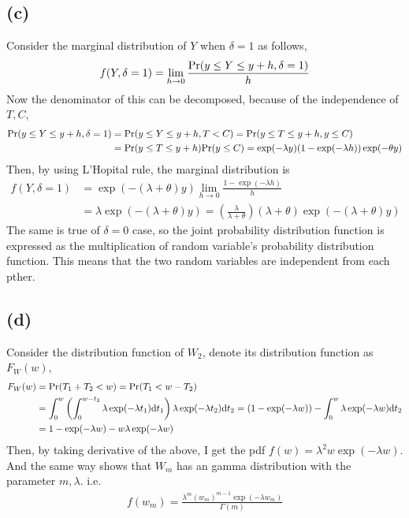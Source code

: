 \documentclass{article}
\begin{document}
\subsection{(c)}
Consider the marginal distribution of $Y$ when $\delta = 1$ as follows,
\begin{align*}
	f(Y, \delta = 1) = \lim_{h \to 0} \frac{{\rm Pr}(y \leq Y \leq y + h, \delta = 1)}{h}
\end{align*}
Now the denominator of this can be decomposed, because of the independence of $T, C$, 
\begin{align*}
	{\rm Pr}(y \leq Y \leq y + h, \delta = 1) &= {\rm Pr}(y \leq Y \leq y + h, T < C) = {\rm Pr}(y \leq T \leq y + h, y \leq C) \\
	&= {\rm Pr}(y \leq T \leq y + h) {\rm Pr}(y \leq C) = \exp(-\lambda y) (1 - \exp(-\lambda h)) \exp(-\theta y) \\
\end{align*}
Then, by using L'Hopital rule, the marginal distribution is 
\begin{align*}
	f(Y, \delta = 1) &= \exp(-(\lambda+\theta)y) \lim_{h \to 0} \frac{1 - \exp(-\lambda h)}{h}\\
	&= \lambda \exp(-(\lambda+\theta)y) = \left(\frac{\lambda}{\lambda+ \theta}\right) (\lambda+\theta)\exp(-(\lambda+\theta)y)
\end{align*}
The same is true of $\delta = 0$ case, so the joint probability distribution function is expressed as the multiplication of random variable's probability distribution function. This means that the two random variables are independent from each pther.

\subsection{(d)}
Consider the distribution function of $W_2$, denote its distribution function as $F_W(w)$,
\begin{align*}
	F_W(w) &= {\rm Pr}(T_1 + T_2 < w) = {\rm Pr}(T_1 < w - T_2)\\
	&= \int_0^w \left( \int_0^{w - t_2} \lambda \exp(-\lambda t_1) \mathrm{d}t_1 \right) \lambda \exp(-\lambda t_2) \mathrm{d}t_2
	=(1 - \exp(-\lambda w)) - \int_0^w \lambda \exp(-\lambda w) \mathrm{d}t_2 \\
	&= 1 - \exp(-\lambda w) - w \lambda \exp(-\lambda w)
\end{align*}
Then, by taking derivative of the above, I get the pdf $f(w) = \lambda^2 w \exp(-\lambda w)$.
And the same way shows that $W_m$ has an gamma distribution with the parameter $m, \lambda$. i.e.
\begin{align*}
	f(w_m) =\frac{\lambda^m (w_m)^{m-1} \exp(-\lambda w_m)}{\Gamma(m)}
\end{align*}
\end{document}
